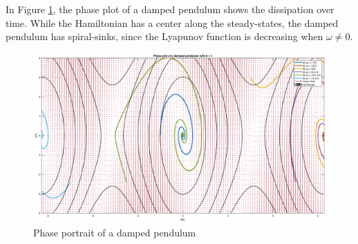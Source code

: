\documentclass[11pt,1in]{article}
\begin{document}
In Figure \ref{fig:damped_pendulum}, the phase plot of a damped pendulum shows the dissipation over time. While the Hamiltonian has a center along the steady-states, the damped pendulum has spiral-sinks, since the Lyapunov function is decreasing when $\omega \neq 0$.  
\begin{figure}[H]
	\centering
	\includegraphics[trim={2in 0 1.5in 0}, width=\linewidth]{Figures/pendulum_phase_damped}
	\caption{Phase portrait of a damped pendulum}
	\label{fig:damped_pendulum}
\end{figure}
\end{document}
